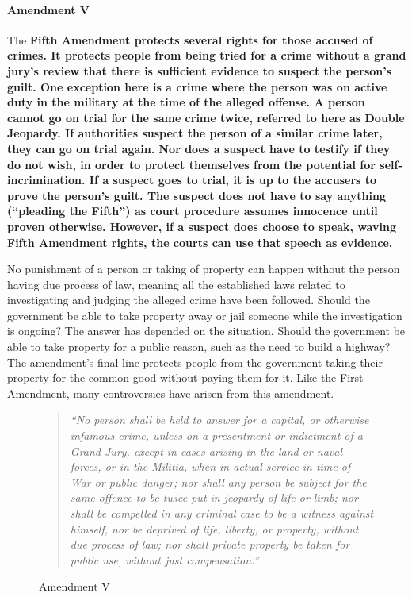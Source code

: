 \paragraph{Amendment V}

The \bf{Fifth Amendment} protects several rights for those accused of crimes. It protects people from being tried for a crime without a grand jury’s review that there is sufficient evidence to suspect the person’s guilt. One exception here is a crime where the person was on active duty in the military at the time of the alleged offense. A person cannot go on trial for the same crime twice, referred to here as \bf{Double Jeopardy}. If authorities suspect the person of a similar crime later, they can go on trial again. Nor does a suspect have to testify if they do not wish, in order to protect themselves from the potential for self-incrimination. If a suspect goes to trial, it is up to the accusers to prove the person’s guilt. The suspect does not have to say anything (“pleading the Fifth”) as court procedure assumes innocence until proven otherwise. However, if a suspect does choose to speak, waving Fifth Amendment rights, the courts can use that speech as evidence.

No punishment of a person or taking of property can happen without the person having due process of law, meaning all the established laws related to investigating and judging the alleged crime have been followed. Should the government be able to take property away or jail someone while the investigation is ongoing? The answer has depended on the situation. Should the government be able to take property for a public reason, such as the need to build a highway? The amendment’s final line protects people from the government taking their property for the common good without paying them for it. Like the First Amendment, many controversies have arisen from this amendment.

\begin{figure}[h]
    \begin{quote}
        \it{“No person shall be held to answer for a capital, or otherwise infamous crime, unless on a presentment or indictment of a Grand Jury, except in cases arising in the land or naval forces, or in the Militia, when in actual service in time of War or public danger; nor shall any person be subject for the same offence to be twice put in jeopardy of life or limb; nor shall be compelled in any criminal case to be a witness against himself, nor be deprived of life, liberty, or property, without due process of law; nor shall private property be taken for public use, without just compensation.”}
    \end{quote}
    \caption{Amendment V}
\end{figure}

